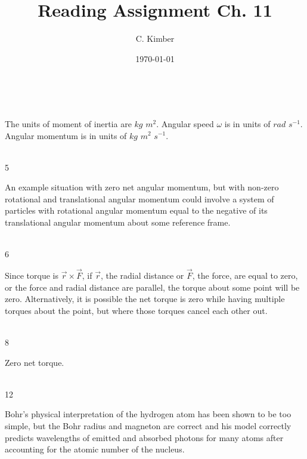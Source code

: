 \documentclass[a4paper,11pt]{article}
\begin{document}
\title{Reading Assignment Ch. 11}
\date{\today}
\author{C. Kimber}
\maketitle
\newpage

\\
\begin{center}
The units of moment of inertia are $kg$ $m^2$. Angular speed
$\omega$ is in units of $rad$ $s^{-1}$. Angular momentum is in
units of $kg$ $m^2$ $s^{-1}$.
\end{center}
\\

5
\\
\begin{center}
An example situation with zero net angular momentum, but with non-zero
rotational and translational angular momentum could involve
a system of particles with rotational angular momentum equal
to the negative of its translational angular momentum about some
reference frame.
\end{center}
\\

6
\\
\begin{center}
Since torque is $\vec{r} \times \vec{F}$, if $\vec{r}$, the radial distance
or $\vec{F}$, the force, are equal to zero, or the force and radial distance are parallel, the
torque about some point will be zero. Alternatively, it is possible
the net torque is zero while having multiple torques about
the point, but where those torques cancel each other out.
\end{center}
\\

8
\\
\begin{center}
Zero net torque.
\end{center}
\\

12
\\
\begin{center}
Bohr's physical interpretation of the hydrogen atom has been
shown to be too simple, but the Bohr radius and magneton are correct and
his model correctly predicts wavelengths of emitted and absorbed
photons for many atoms after accounting for the atomic number of the
nucleus. 
\end{center}
\end{document}
